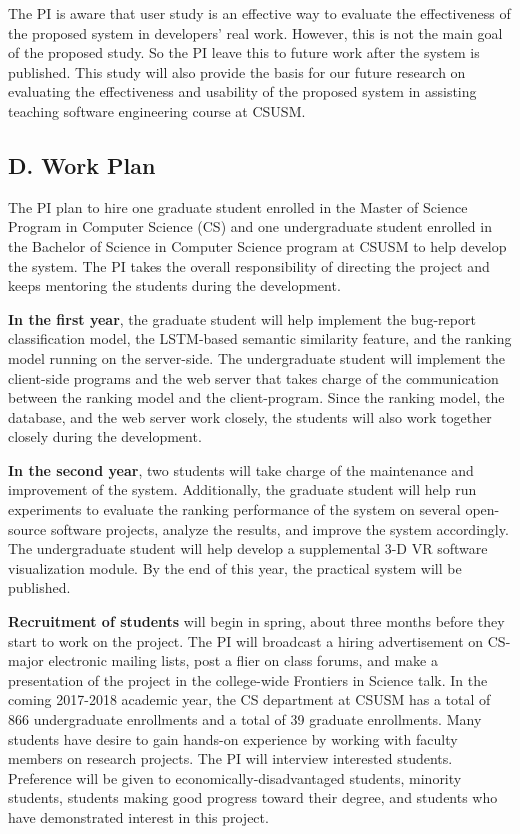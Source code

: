 The PI is aware that user study is an effective way to evaluate the effectiveness of the proposed system in developers' real work. However, this is not the main goal of the proposed study. So the PI leave this to future work after the system is published. This study will also provide the basis for our future research on evaluating the effectiveness and usability of the proposed system in assisting teaching software engineering course at CSUSM.

\subsection{D. Work Plan}
The PI plan to hire one graduate student enrolled in the Master of Science Program in Computer Science (CS) and one undergraduate student enrolled in the Bachelor of Science in Computer Science program at CSUSM to help develop the system. The PI takes the overall responsibility of directing the project and keeps mentoring the students during the development.

\textbf{In the first year}, the graduate student will help implement the bug-report classification model, the LSTM-based semantic similarity feature, and the ranking model running on the server-side. The undergraduate student will implement the client-side programs and the web server that takes charge of the communication between the ranking model and the client-program. Since the ranking model, the database, and the web server work closely, the students will also work together closely during the development.

\textbf{In the second year}, two students will take charge of the maintenance and improvement of the system. Additionally, the graduate student will help run experiments to evaluate the ranking performance of the system on several open-source software projects, analyze the results, and improve the system accordingly. The undergraduate student will help develop a supplemental 3-D VR software visualization module. By the end of this year, the practical system will be published.

\textbf{Recruitment of students} will begin in spring, about three months before they start to work on the project. The PI will broadcast a hiring advertisement on CS-major electronic mailing lists, post a flier on class forums, and make a presentation of the project in the college-wide Frontiers in Science talk. In the coming 2017-2018 academic year, the CS department at CSUSM has a total of 866 undergraduate enrollments and a total of 39 graduate enrollments. Many students have desire to gain hands-on experience by working with faculty members on research projects. The PI will interview interested students. Preference will be given to economically-disadvantaged students, minority students, students making good progress toward their degree, and students who have demonstrated interest in this project.

